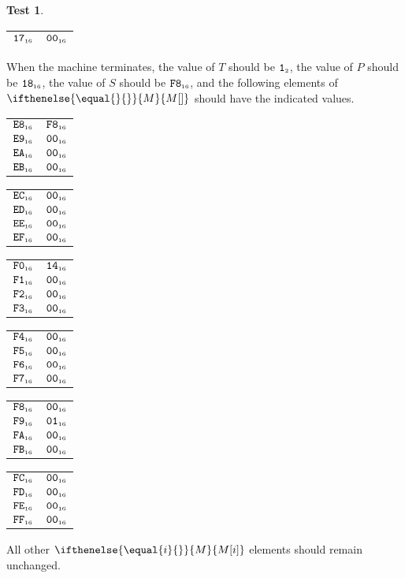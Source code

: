 \documentclass[a4paper,12pt]{article}
\makeatletter
\newcommand{\num}[1]{\texttt{#1}}
\newcommand{\hex}[1]{\num{#1}_{\textup{\tiny 16}}}
\newcommand{\bin}[1]{\num{#1}_{\textup{\tiny 2}}}
\newcommand{\MEM}[1]{\ifthenelse{\equal{#1}{}}{M}{M[#1]}}
\newcommand{\PC}{P}
\newcommand{\SP}{S}
\newcommand{\TERM}{T}
\newcommand{\T}{\bin{1}}
\theoremstyle{definition}
\newtheorem{test}{Test}
\newenvironment{memtable}{%
  \begin{trivlist}
    \item
    }{%
    \end{trivlist}}
\newenvironment{memcolumn}{%
  \begin{tabular}{@{}ll@{}}
    \hline}
    {%
    \hline
  \end{tabular}}
\newcommand{\memspace}{\qquad}
\makeatother
\begin{document}
\begin{test}
\begin{memtable}
\begin{memcolumn}
      $\hex{17}$ & $\hex{00}$ \\
    \end{memcolumn}
  \end{memtable}
  When the machine terminates, the value of $\TERM$ should be $\T$, the value of $\PC$ should be $\hex{18}$, the value of $\SP$ should be $\hex{F8}$, and the following elements of $\MEM{}$ should have the indicated values.
  \begin{memtable}
    \begin{memcolumn}
      $\hex{E8}$ & $\hex{F8}$ \\
      $\hex{E9}$ & $\hex{00}$ \\
      $\hex{EA}$ & $\hex{00}$ \\
      $\hex{EB}$ & $\hex{00}$ \\
    \end{memcolumn}
    \memspace
    \begin{memcolumn}
      $\hex{EC}$ & $\hex{00}$ \\
      $\hex{ED}$ & $\hex{00}$ \\
      $\hex{EE}$ & $\hex{00}$ \\
      $\hex{EF}$ & $\hex{00}$ \\
    \end{memcolumn}
    \memspace
    \begin{memcolumn}
      $\hex{F0}$ & $\hex{14}$ \\
      $\hex{F1}$ & $\hex{00}$ \\
      $\hex{F2}$ & $\hex{00}$ \\
      $\hex{F3}$ & $\hex{00}$ \\
    \end{memcolumn}
    \memspace
    \begin{memcolumn}
      $\hex{F4}$ & $\hex{00}$ \\
      $\hex{F5}$ & $\hex{00}$ \\
      $\hex{F6}$ & $\hex{00}$ \\
      $\hex{F7}$ & $\hex{00}$ \\
    \end{memcolumn}
    \memspace
    \begin{memcolumn}
      $\hex{F8}$ & $\hex{00}$ \\
      $\hex{F9}$ & $\hex{01}$ \\
      $\hex{FA}$ & $\hex{00}$ \\
      $\hex{FB}$ & $\hex{00}$ \\
    \end{memcolumn}
    \memspace
    \begin{memcolumn}
      $\hex{FC}$ & $\hex{00}$ \\
      $\hex{FD}$ & $\hex{00}$ \\
      $\hex{FE}$ & $\hex{00}$ \\
      $\hex{FF}$ & $\hex{00}$ \\
    \end{memcolumn}
  \end{memtable}
  All other $\MEM{i}$ elements should remain unchanged.
\end{test}
\end{document}
